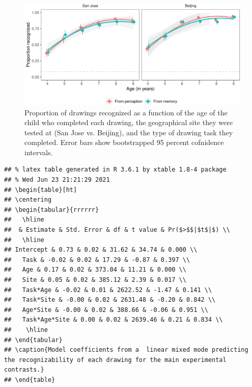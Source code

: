 \documentclass[
  english,
  man]{apa6}
\begin{document}
\begin{figure}[H]

{\centering \includegraphics[width=\textwidth]{Manuscript_June2021_files/figure-latex/main-results-1} 

}

\caption{Proportion of drawings recognized as a function of the age of the child who completed each drawing, the geographical site they were tested at (San Jose vs. Beijing), and the type of drawing task they completed. Error bars show bootstrapped 95 percent cofnidence intervals.}\label{fig:main-results}
\end{figure}

\begin{verbatim}
## % latex table generated in R 3.6.1 by xtable 1.8-4 package
## % Wed Jun 23 21:21:29 2021
## \begin{table}[ht]
## \centering
## \begin{tabular}{rrrrrr}
##   \hline
##  & Estimate & Std. Error & df & t value & Pr($>$$|$t$|$) \\ 
##   \hline
## Intercept & 0.73 & 0.02 & 31.62 & 34.74 & 0.000 \\ 
##   Task & -0.02 & 0.02 & 17.29 & -0.87 & 0.397 \\ 
##   Age & 0.17 & 0.02 & 373.04 & 11.21 & 0.000 \\ 
##   Site & 0.05 & 0.02 & 385.12 & 2.39 & 0.017 \\ 
##   Task*Age & -0.02 & 0.01 & 2622.52 & -1.47 & 0.141 \\ 
##   Task*Site & -0.00 & 0.02 & 2631.48 & -0.20 & 0.842 \\ 
##   Age*Site & -0.00 & 0.02 & 388.66 & -0.06 & 0.951 \\ 
##   Task*Age*Site & 0.00 & 0.02 & 2639.46 & 0.21 & 0.834 \\ 
##    \hline
## \end{tabular}
## \caption{Model coefficients from a  linear mixed mode predicting the recognizability of each drawing for the main experimental contrasts.} 
## \end{table}
\end{verbatim}
\end{document}
